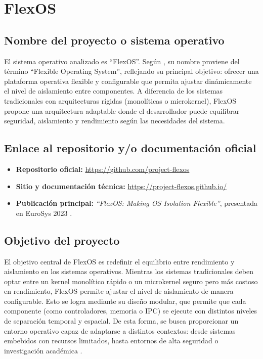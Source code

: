 \section{FlexOS}

\subsection{Nombre del proyecto o sistema operativo}
El sistema operativo analizado es ``FlexOS''.  
Según \citep{flexos2023paper}, su nombre proviene del término “Flexible Operating System”, reflejando su principal objetivo: ofrecer una plataforma operativa flexible y configurable que permita ajustar dinámicamente el nivel de aislamiento entre componentes.  
A diferencia de los sistemas tradicionales con arquitecturas rígidas (monolíticas o microkernel), FlexOS propone una arquitectura adaptable donde el desarrollador puede equilibrar seguridad, aislamiento y rendimiento según las necesidades del sistema.

\subsection{Enlace al repositorio y/o documentación oficial}
\begin{itemize}
    \item \textbf{Repositorio oficial:} \url{https://github.com/project-flexos}
    \item \textbf{Sitio y documentación técnica:} \url{https://project-flexos.github.io/}
    \item \textbf{Publicación principal:} \textit{“FlexOS: Making OS Isolation Flexible”}, presentada en EuroSys 2023 \citep{flexos2023paper}.
\end{itemize}

\subsection{Objetivo del proyecto}
El objetivo central de FlexOS es redefinir el equilibrio entre rendimiento y aislamiento en los sistemas operativos.  
Mientras los sistemas tradicionales deben optar entre un kernel monolítico rápido o un microkernel seguro pero más costoso en rendimiento, FlexOS permite ajustar el nivel de aislamiento de manera configurable.  
Esto se logra mediante su diseño modular, que permite que cada componente (como controladores, memoria o IPC) se ejecute con distintos niveles de separación temporal y espacial.  
De esta forma, se busca proporcionar un entorno operativo capaz de adaptarse a distintos contextos: desde sistemas embebidos con recursos limitados, hasta entornos de alta seguridad o investigación académica \citep{flexos2023paper}.

